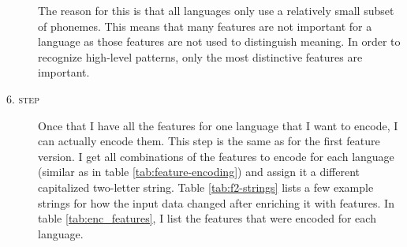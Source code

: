 \begin{description}
    The reason for this is that all languages only use a relatively small subset of phonemes. This means that many features are not important for a language as those features are not used to distinguish meaning. In order to recognize high-level patterns, only the most distinctive features are important.
    \item[\textsc{6. step}] Once that I have all the features for one language that I want to encode, I can actually encode them. This step is the same as for the first feature version. I get all combinations of the features to encode for each language (similar as in table \ref{tab:feature-encoding}) and assign it a different capitalized two-letter string. Table \ref{tab:f2-strings} lists a few example strings for how the input data changed after enriching it with features. In table \ref{tab:enc_features}, I list the features that were encoded for each language. 
\end{description}




